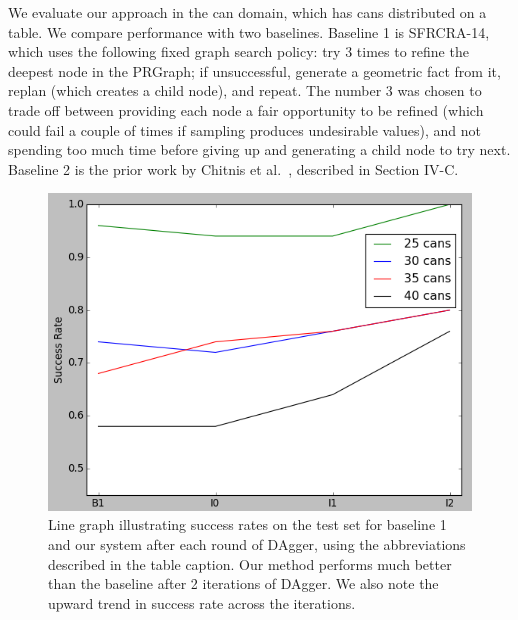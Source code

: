 We evaluate our approach in the can domain, which has cans distributed on a table. We
compare performance with two baselines. Baseline 1 is SFRCRA-14, which uses the
following fixed graph search policy: try 3 times to refine the deepest
node in the PRGraph; if unsuccessful, generate a geometric fact from it, replan (which
creates a child node), and repeat. The number 3 was chosen to trade off between providing
each node a fair opportunity to be refined (which could fail a couple of times if sampling produces
undesirable values), and not spending too much time before giving up and generating a child node to try next.
Baseline 2 is the prior work by Chitnis et al.~\cite{chitnis2015mlpc}, described in Section IV-C.

\begin{figure}[h]
  \centering
    \includegraphics[scale=0.43]{images/results_line.png}
  \caption{\small{Line graph illustrating success rates on the test set for baseline 1
and our system after each round of DAgger, using the abbreviations described in the
table caption. Our method performs much better than the baseline after 2 iterations of DAgger.
We also note the upward trend in success rate across the iterations.}}
  \label{fig:results_line}
\end{figure}

